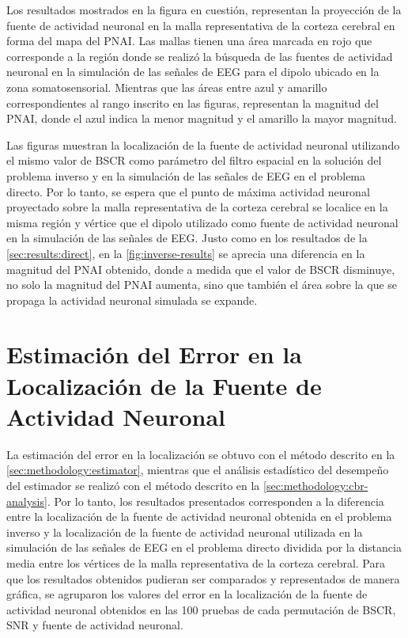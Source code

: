Los resultados mostrados en la figura en cuestión, representan la proyección de la fuente de actividad neuronal en la malla representativa de la corteza cerebral en forma del mapa del PNAI.
Las mallas tienen una área marcada en rojo  que corresponde a la región donde se realizó la búsqueda de las fuentes de actividad neuronal en la simulación de las señales de EEG para el dipolo ubicado en la zona somatosensorial.
Mientras que las áreas entre azul y amarillo correspondientes al rango inscrito en las figuras, representan la magnitud del PNAI, donde el azul indica la menor magnitud y el amarillo la mayor magnitud.

Las figuras muestran la localización de la fuente de actividad neuronal utilizando el mismo valor de BSCR como parámetro del filtro espacial en la solución del problema inverso y en la simulación de las señales de EEG en el problema directo.
Por lo tanto, se espera que el punto de máxima actividad neuronal proyectado sobre la malla representativa de la corteza cerebral se localice en la misma región y vértice que el dipolo utilizado como fuente de actividad neuronal en la simulación de las señales de EEG.
Justo como en los resultados de la \cref{sec:results:direct}, en la \cref{fig:inverse-results} se aprecia una diferencia en la magnitud del PNAI obtenido, donde a medida que el valor de BSCR disminuye, no solo la magnitud del PNAI aumenta, sino que también el área sobre la que se propaga la actividad neuronal simulada se expande.

\section{Estimación del Error en la Localización de la Fuente de Actividad Neuronal}
\label{sec:results:error}

La estimación del error en la localización se obtuvo con el método descrito en la \cref{sec:methodology:estimator}, mientras que el análisis estadístico del desempeño del estimador se realizó con el método descrito en la \cref{sec:methodology:cbr-analysis}.
Por lo tanto, los resultados presentados corresponden a la diferencia entre la localización de la fuente de actividad neuronal obtenida en el problema inverso y la localización de la fuente de actividad neuronal utilizada en la simulación de las señales de EEG en el problema directo dividida por la distancia media entre los vértices de la malla representativa de la corteza cerebral. 
Para que los resultados obtenidos pudieran ser comparados y representados de manera gráfica, se agruparon los valores del error en la localización de la fuente de actividad neuronal obtenidos en las 100 pruebas de cada permutación de BSCR, SNR y fuente de actividad neuronal.



